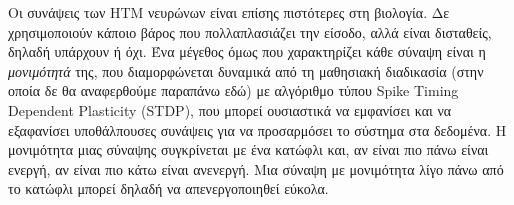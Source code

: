 Οι συνάψεις των HTM νευρώνων είναι επίσης πιστότερες στη βιολογία.
Δε χρησιμοποιούν κάποιο βάρος που πολλαπλασιάζει την είσοδο, αλλά είναι δισταθείς, δηλαδή υπάρχουν ή όχι.
Ένα μέγεθος όμως που χαρακτηρίζει κάθε σύναψη είναι η \emph{μονιμότητά} της, που διαμορφώνεται δυναμικά από τη μαθησιακή διαδικασία (στην οποία δε θα αναφερθούμε παραπάνω εδώ) με αλγόριθμο τύπου Spike Timing Dependent Plasticity (STDP), που μπορεί ουσιαστικά να εμφανίσει και να εξαφανίσει υποθάλπουσες συνάψεις για να προσαρμόσει το σύστημα στα δεδομένα.
Η μονιμότητα μιας σύναψης συγκρίνεται με ένα κατώφλι και, αν είναι πιο πάνω είναι ενεργή, αν είναι πιο κάτω είναι ανενεργή.
Μια σύναψη με μονιμότητα λίγο πάνω από το κατώφλι μπορεί δηλαδή να απενεργοποιηθεί εύκολα.


%
%
%
%
%
%
%
%
